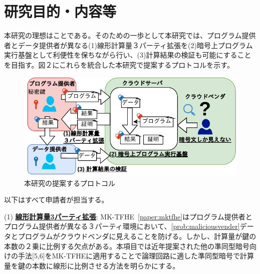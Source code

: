 
\section{研究目的・内容等}


本研究の理想はことである。そのための一歩として本研究では、プログラム提供者とデータ提供者が異なる(1)線形計算量３パーティ拡張を(2)暗号上プログラム実行基盤として利便性を保ちながら行い、(3)計算結果の検証も可能にすることを目指す。図２にこれらを統合した本研究で提案するプロトコルを示す。

\begin{figure}[h]
    \centering
    \includegraphics[width=0.8\linewidth]{figures/solution.drawio.pdf}
    \vspace*{-0.5cm}
    \caption{本研究の提案するプロトコル}
    \label{fig:solution}
\end{figure}


以下はすべて申請者が担当する。

\noindent(1) \underline{\textbf{線形計算量3パーティ拡張}}: MK-TFHE~\ref{paper:mktfhe}はプログラム提供者とプログラム提供者が異なる３パーティ環境において、\ref{prob:maliciousvender}データとプログラムがクラウドベンダに見えることを防げる。しかし、計算量が鍵の本数の２乗に比例する欠点がある。本項目では近年提案された他の準同型暗号向けの手法[5,6]をMK-TFHEに適用することで論理回路に適した準同型暗号で計算量を鍵の本数に線形に比例させる方法を明らかにする。

